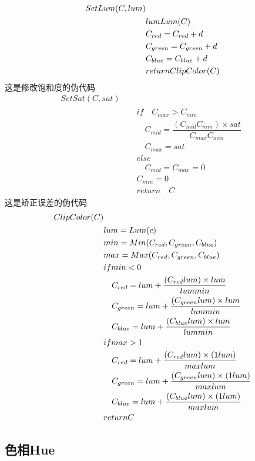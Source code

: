 $$\begin{aligned}SetLum(C,lum)&\\& \begin{aligned}&lum  Lum(C)\\&C_{red}=C_{red}+d\\& C_{green}=C_{green}+d\\&C_{blue}=C_{blue}+d\\ &return\space ClipColor(C)\end{aligned}\end{aligned}$$
这是修改饱和度的伪代码
$$\begin{aligned}SetSat(C,sat)&\\&\begin{aligned}&if \quad C_{max}>C_{min}\\&\quad C_{mid}=\dfrac{(C_{mid}C_{min})\times sat}{C_{max}C_{min}}\\&\quad C_{max}=sat\\&else\\&\quad C_{mid}=C_{max}=0\\&C_{min}=0\\&return \quad C\end{aligned}\end{aligned}$$
这是矫正误差的伪代码
$$\begin{aligned} ClipColor(C)&\\&\begin{aligned}&lum= Lum(c)\\&min = Min(C_{red},C_{green},C_{blue}) \\&max = Max(C_{red},C_{green},C_{blue})\\&if \space min<0\\&\quad C_{red}=lum+\dfrac{(C_{red}lum)\times lum}{lummin}\\&\quad C_{green}=lum+\dfrac{(C_{green}lum)\times lum}{lummin}\\&\quad C_{blue}=lum+\dfrac{(C_{blue}lum)\times lum}{lummin}\\&if \space max>1\\&\quad C_{red}=lum+\dfrac{(C_{red}lum)\times (1lum)}{maxlum}\\&\quad C_{green}=lum+\dfrac{(C_{green}lum)\times  (1lum)}{maxlum}\\&\quad C_{blue}=lum+\dfrac{(C_{blue}lum)\times  (1lum)}{maxlum}\\&return\space C\end{aligned}\end{aligned}$$

\subsection{ 色相Hue}

